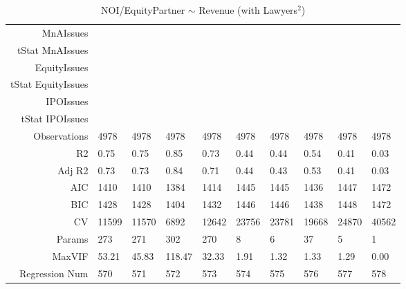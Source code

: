 \begin{table}[ht]
\begin{tabular}{rlllllllll}
  MnAIssues &  &  &  &  &  &  &  &  &  \\ 
  tStat MnAIssues &  &  &  &  &  &  &  &  &  \\ 
  EquityIssues &  &  &  &  &  &  &  &  &  \\ 
  tStat EquityIssues &  &  &  &  &  &  &  &  &  \\ 
  IPOIssues &  &  &  &  &  &  &  &  &  \\ 
  tStat IPOIssues &  &  &  &  &  &  &  &  &  \\ 
  Observations & 4978 & 4978 & 4978 & 4978 & 4978 & 4978 & 4978 & 4978 & 4978 \\ 
  R2 & 0.75 & 0.75 & 0.85 & 0.73 & 0.44 & 0.44 & 0.54 & 0.41 & 0.03 \\ 
  Adj R2 & 0.73 & 0.73 & 0.84 & 0.71 & 0.44 & 0.43 & 0.53 & 0.41 & 0.03 \\ 
  AIC & 1410 & 1410 & 1384 & 1414 & 1445 & 1445 & 1436 & 1447 & 1472 \\ 
  BIC & 1428 & 1428 & 1404 & 1432 & 1446 & 1446 & 1438 & 1448 & 1472 \\ 
  CV & 11599 & 11570 & 6892 & 12642 & 23756 & 23781 & 19668 & 24870 & 40562 \\ 
  Params & 273 & 271 & 302 & 270 & 8 & 6 & 37 & 5 & 1 \\ 
  MaxVIF & 53.21 & 45.83 & 118.47 & 32.33 & 1.91 & 1.32 & 1.33 & 1.29 & 0.00 \\ 
  Regression Num & 570 & 571 & 572 & 573 & 574 & 575 & 576 & 577 & 578 \\ 
   \hline
\end{tabular}
\caption{NOI/EquityPartner $\sim$ Revenue (with Lawyers$^2$)} 
\end{table}
